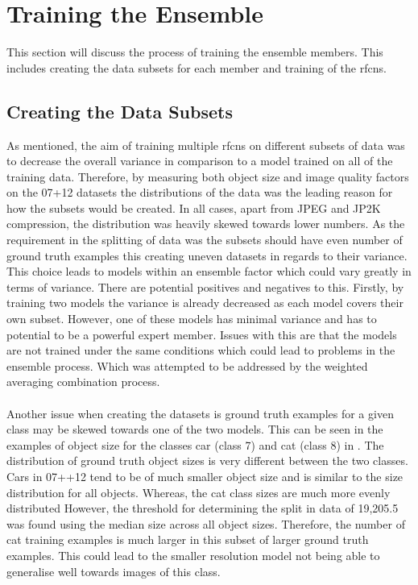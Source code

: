 \section{Training the Ensemble}
This section will discuss the process of training the ensemble members. This includes creating the data subsets for each member and training of the \glspl{rfcn}.

\subsection{Creating the Data Subsets}
As mentioned, the aim of training multiple \glspl{rfcn} on different subsets of data was to decrease the overall variance in comparison to a model trained on all of the training data. Therefore, by measuring both object size and image quality factors on the 07+12 datasets the distributions of the data was the leading reason for how the subsets would be created. In all cases, apart from JPEG and JP2K compression, the distribution was heavily skewed towards lower numbers. As the requirement in the splitting of data was the subsets should have even number of ground truth examples this creating uneven datasets in regards to their variance. This choice leads to models within an ensemble factor which could vary greatly in terms of variance. There are potential positives and negatives to this. Firstly, by training two models the variance is already decreased as each model covers their own subset. However, one of these models has minimal variance and has to potential to be a powerful expert member. Issues with this are that the models are not trained under the same conditions which could lead to problems in the ensemble process. Which was attempted to be addressed by the weighted averaging combination process.
\\\\
Another issue when creating the datasets is ground truth examples for a given class may be skewed towards one of the two models. This can be seen in the examples of object size for the classes car (class 7) and cat (class 8) in . The distribution of ground truth object sizes is very different between the two classes. Cars in 07++12 tend to be of much smaller object size and is similar to the size distribution for all objects. Whereas, the cat class sizes are much more evenly distributed  However, the threshold for determining the split in data of 19,205.5 was found using the median size across all object sizes. Therefore, the number of cat training examples is much larger in this subset of larger ground truth examples. This could lead to the smaller resolution model not being able to generalise well towards images of this class.


